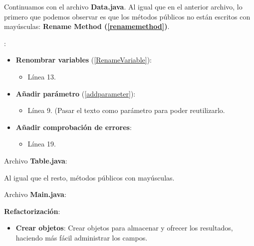 \documentclass[11pt,a4paper,oneside]{book}
\begin{document}
Continuamos con el archivo \textbf{Data.java}. Al igual que en el anterior archivo, lo primero que podemos observar es que los métodos públicos no están escritos con mayúsculas: \textbf{Rename Method (\ref{renamemethod})}.



:
\begin{itemize}
    \item \textbf{Renombrar variables} (\ref{RenameVariable}):
    \begin{itemize}
        \item Línea 13.
    \end{itemize}
    
    \item \textbf{Añadir parámetro} (\ref{addparameter}):
    \begin{itemize}
        \item Línea 9. (Pasar el texto como parámetro para poder reutilizarlo.
    \end{itemize}
    
    \item \textbf{Añadir comprobación de errores}:
    \begin{itemize}
        \item Línea 19.
    \end{itemize}
\end{itemize}

Archivo \textbf{Table.java}:


Al igual que el resto, métodos públicos con mayúsculas.

Archivo \textbf{Main.java}:


\textbf{Refactorización}:
\begin{itemize}
    \item \textbf{Crear objetos}: Crear objetos para almacenar y ofrecer los resultados, haciendo más fácil administrar los campos.
\end{itemize}
\end{document}
